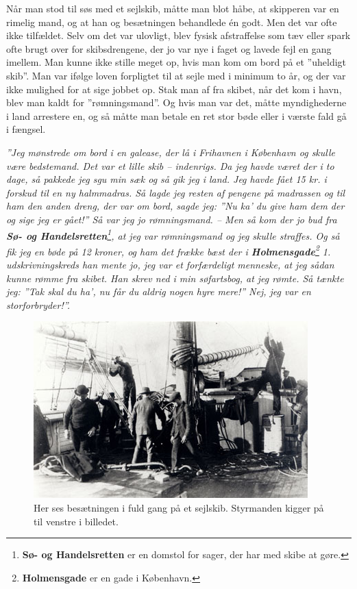 Når man stod til søs med et sejlskib, måtte man blot håbe, at skipperen
var en rimelig mand, og at han og besætningen behandlede én godt. Men
det var ofte ikke tilfældet. Selv om det var ulovligt, blev fysisk
afstraffelse som tæv eller spark ofte brugt over for skibsdrengene, der
jo var nye i faget og lavede fejl en gang imellem. Man kunne ikke stille
meget op, hvis man kom om bord på et ''uheldigt skib''. Man var ifølge
loven forpligtet til at sejle med i minimum to år, og der var ikke
mulighed for at sige jobbet op. Stak man af fra skibet, når det kom i
havn, blev man kaldt for ''rømningsmand''. Og hvis man var det, måtte
myndighederne i land arrestere en, og så måtte man betale en ret stor
bøde eller i værste fald gå i fængsel.

\emph{''Jeg mønstrede om bord i en galease, der lå i Frihavnen i
København og skulle være bedstemand. Det var et lille skib -- indenrigs.
Da jeg havde været der i to dage, så pakkede jeg sgu min sæk og så gik
jeg i land. Jeg havde fået 15 kr. i forskud til en ny halmmadras. Så
lagde jeg resten af pengene på madrassen og til ham den anden dreng, der
var om bord, sagde jeg: ''Nu ka' du give ham dem der og sige jeg er
gået!'' Så var jeg jo rømningsmand. -- Men så kom der jo bud fra
\textbf{Sø- og Handelsretten}\footnote{\textbf{Sø- og Handelsretten} er
  en domstol for sager, der har med skibe at gøre.}, at jeg var
rømningsmand og jeg skulle straffes. Og så fik jeg en bøde på 12 kroner,
og ham det frække bæst der i \textbf{Holmensgade}\footnote{\textbf{Holmensgade}
  er en gade i København.} 1. udskrivningskreds han mente jo, jeg var et
forfærdeligt menneske, at jeg sådan kunne rømme fra skibet. Han skrev
ned i min søfartsbog, at jeg rømte. Så tænkte jeg: ''Tak skal du ha', nu
får du aldrig nogen hyre mere!'' Nej, jeg var en storforbryder!''.}

\begin{figure}
\centering
\includegraphics{images/sejlskibe_tema-3-arbejdsfor.jpg}
\caption{Her ses besætningen i fuld gang på et sejlskib. Styrmanden
kigger på til venstre i billedet.}
\end{figure}

